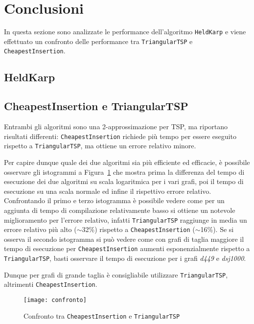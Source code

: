 \section{Conclusioni}
In questa sezione sono analizzate le performance dell'algoritmo \texttt{HeldKarp} e viene effettuato un confronto delle performance tra \texttt{TriangularTSP} e \texttt{CheapestInsertion}.

\subsection{HeldKarp}

\subsection{CheapestInsertion e TriangularTSP}
Entrambi gli algoritmi sono una 2-approssimazione per TSP, ma riportano risultati differenti: \texttt{CheapestInsertion} richiede più tempo per essere eseguito rispetto a \texttt{TriangularTSP}, ma ottiene un errore relativo minore.\acapo

Per capire dunque quale dei due algoritmi sia più efficiente ed efficacie, è possibile osservare gli istogrammi a Figura~\ref{confronto} che mostra prima la differenza del tempo di esecuzione dei due algoritmi su scala logaritmica per i vari grafi, poi il tempo di esecuzione su una scala normale ed infine il rispettivo errore relativo. Confrontando il primo e terzo istogramma è possibile vedere come per un aggiunta di tempo di compilazione relativamente basso si ottiene un notevole miglioramento per l'errore relativo, infatti \texttt{TriangularTSP} raggiunge in media un errore relativo più alto ($\sim$32\%) rispetto a \texttt{CheapestInsertion} ($\sim$16\%). Se si osserva il secondo istogramma si può vedere come con grafi di taglia maggiore il tempo di esecuzione per \texttt{CheapestInsertion} aumenti esponenzialmente rispetto a \texttt{TriangularTSP}, basti osservare il tempo di esecuzione per i grafi \textit{d449} e \textit{dsj1000}.\acapo

Dunque per grafi di grande taglia è consigliabile utilizzare \texttt{TriangularTSP}, altrimenti \texttt{CheapestInsertion}.

\begin{figure}
	\centering
	\texttt{[image: confronto]}
	\caption{Confronto tra \texttt{CheapestInsertion} e \texttt{TriangularTSP}}
	\label{confronto}
\end{figure}
